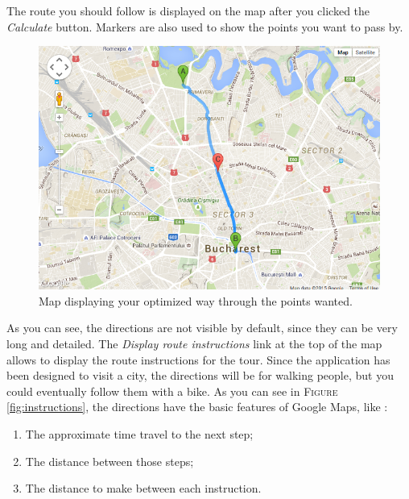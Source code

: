 		The route you should follow is displayed on the map after you clicked the \textit{Calculate} button. Markers are also used to show the points you want to pass by.
		
		\begin{figure}[h!]
			\centering
			\includegraphics[scale=0.7]{input/map_result.png}
			\caption{\label{fig:map_result}Map displaying your optimized way through the points wanted.}
		\end{figure}
		
		As you can see, the directions are not visible by default, since they can be very long and detailed. The \textit{Display route instructions} link at the top of the map allows to display the route instructions for the tour. Since the application has been designed to visit a city, the directions will be for walking people, but you could eventually follow them with a bike. As you can see in \textsc{Figure} \ref{fig:instructions}, the directions have the basic features of Google Maps, like :
		
		\begin{enumerate}
			\item The approximate time travel to the next step;
			\item The distance between those steps;
			\item The distance to make between each instruction.
		\end{enumerate}
		
